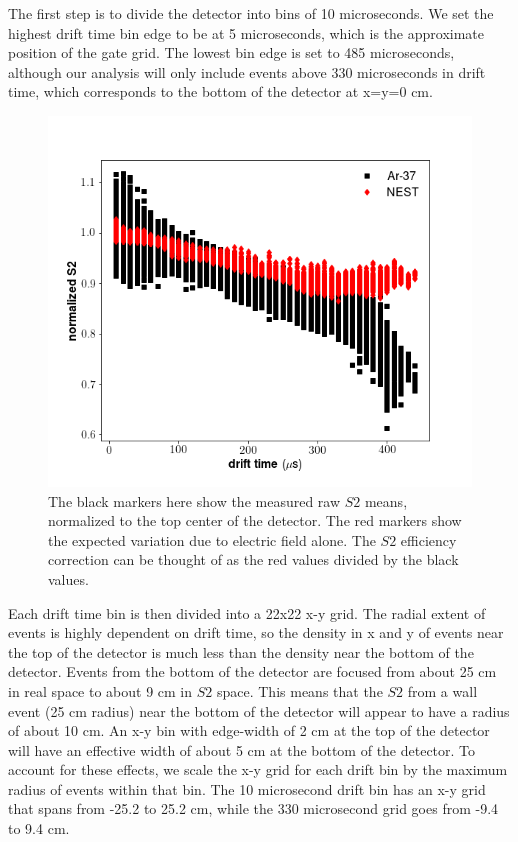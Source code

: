 {The first step is to divide the detector into bins of 10 microseconds. We set the highest drift time bin edge to be at 5 microseconds, which is the approximate position of the gate grid. The lowest bin edge is set to 485 microseconds, although our analysis will only include events above 330 microseconds in drift time, which corresponds to the bottom of the detector at x=y=0 cm.
\begin{figure}[h!]
\centering
\includegraphics[width=150mm]{Figures/S2trend_dt.png}
\caption{The black markers here show the measured raw $S2$ means, normalized to the top center of the detector. The red markers show the expected variation due to electric field alone. The $S2$ efficiency correction can be thought of as the red values divided by the black values.}
\label{fig:S2trend_dt} 
\end{figure}

Each drift time bin is then divided into a 22x22 x-y grid. The radial extent of events is highly dependent on drift time, so the density in x and y of events near the top of the detector is much less than the density near the bottom of the detector. Events from the bottom of the detector are focused from about 25 cm in real space to about 9 cm in $S2$ space. This means that the $S2$ from a wall event (25 cm radius) near the bottom of the detector will appear to have a radius of about 10 cm. An x-y bin with edge-width of 2 cm at the top of the detector will have an effective width of about 5 cm at the bottom of the detector. To account for these effects, we scale the x-y grid for each drift bin by the maximum radius of events within that bin. The 10 microsecond drift bin has an x-y grid that spans from -25.2 to 25.2 cm, while the 330 microsecond grid goes from -9.4 to 9.4 cm.

}

